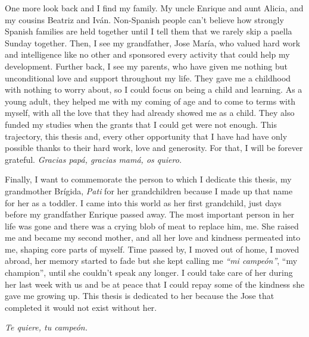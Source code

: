 One more look back and I find my family. My uncle Enrique and aunt Alicia, and my cousins Beatriz and Iván. Non-Spanish people can't believe how strongly Spanish families are held together until I tell them that we rarely skip a paella Sunday together. Then, I see my grandfather, Jose María, who valued hard work and intelligence like no other and sponsored every activity that could help my development. Further back, I see my parents, who have given me nothing but unconditional love and support throughout my life. They gave me a childhood with nothing to worry about, so I could focus on being a child and learning. As a young adult, they helped me with my coming of age and to come to terms with myself, with all the love that they had already showed me as a child. They also funded my studies when the grants that I could get were not enough. This trajectory, this thesis and, every other opportunity that I have had have only possible thanks to their hard work, love and generosity. For that, I will be forever grateful. \textit{Gracias papá, gracias mamá, os quiero.}

Finally, I want to commemorate the person to which I dedicate this thesis, my grandmother Brígida, \textit{Pati} for her grandchildren because I made up that name for her as a toddler. I came into this world as her first grandchild, just days before my grandfather Enrique passed away. The most important person in her life was gone and there was a crying blob of meat to replace him, me. She raised me and became my second mother, and all her love and kindness permeated into me, shaping core parts of myself. Time passed by, I moved out of home, I moved abroad, her memory started to fade but she kept calling me \textit{``mi campeón''}, ``my champion'', until she couldn't speak any longer. I could take care of her during her last week with us and be at peace that I could repay some of the kindness she gave me growing up. This thesis is dedicated to her because the Jose that completed it would not exist without her. 

\textit{Te quiere, tu campeón.}